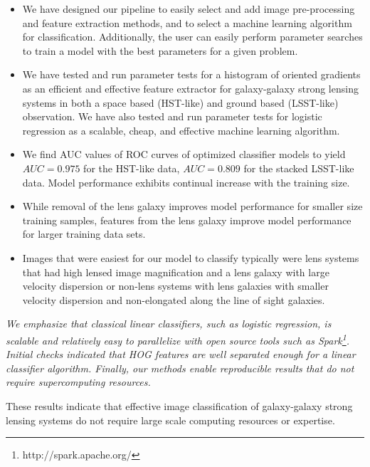 \documentclass{emulateapj}
\newcommand{\wording}[1]{{\it\color{purple} #1}}
\begin{document}
\begin{itemize}

\item We have designed our pipeline to easily select and add image
  pre-processing and feature extraction methods, and to select a
  machine learning algorithm for classification.  Additionally, the
  user can easily perform parameter searches to train a model with the
  best parameters for a given problem.

\item We have tested and run parameter tests for a histogram of
  oriented gradients as an efficient and effective feature extractor
  for galaxy-galaxy strong lensing systems in both a space based
  (HST-like) and ground based (LSST-like) observation.  We have also
  tested and run parameter tests for logistic regression as a
  scalable, cheap, and effective machine learning algorithm.

\item We find AUC values of ROC curves of optimized classifier models
  to yield $AUC=0.975$ for the HST-like data, $AUC=0.809$ for the
  stacked LSST-like data.  Model performance exhibits continual
  increase with the training size.

\item While removal of the lens galaxy improves model performance for
  smaller size training samples, features from the lens galaxy improve
  model performance for larger training data sets.

\item Images that were easiest for our model to classify typically
  were lens systems that had high lensed image magnification and a
  lens galaxy with large velocity dispersion or non-lens systems with
  lens galaxies with smaller velocity dispersion and non-elongated
  along the line of sight galaxies.
\end{itemize}

\wording{We emphasize that classical linear classifiers, such as
  logistic regression, is scalable and relatively easy to parallelize
  with open source tools such as {\em
    Spark}\footnote{http://spark.apache.org/}.  Initial checks
  indicated that HOG features are well separated enough for a linear
  classifier algorithm.  Finally, our methods enable reproducible
  results that do not require supercomputing resources.

These results indicate that effective image classification of
galaxy-galaxy strong lensing systems do not require large scale
computing resources or expertise.}
\end{document}
